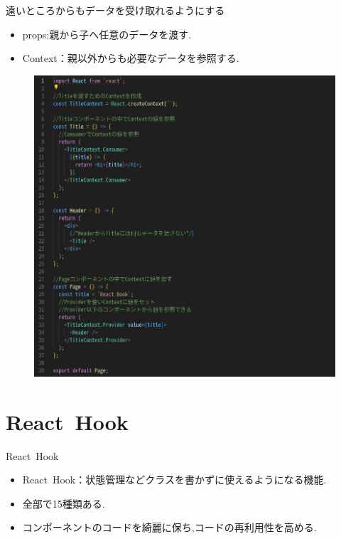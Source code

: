 \documentclass[aspectratio=169]{beamer}
\begin{document}
\begin{frame}[allowframebreaks]{遠いところからもデータを受け取れるようにする}
    \begin{itemize}
        \item props:親から子へ任意のデータを渡す.
        \item Context：親以外からも必要なデータを参照する.
    \end{itemize}
    \begin{figure}
        \centering
       \includegraphics[scale=0.25]{ContextSample_tsx.png}
    \end{figure}
\end{frame}

\section{React\ Hook}
\begin{frame}{React\ Hook}
    \begin{itemize}
        \item React\ Hook：状態管理などクラスを書かずに使えるようになる機能.
        \item 全部で15種類ある.
        \item コンポーネントのコードを綺麗に保ち,コードの再利用性を高める.
    \end{itemize}
\end{frame}
\end{document}
